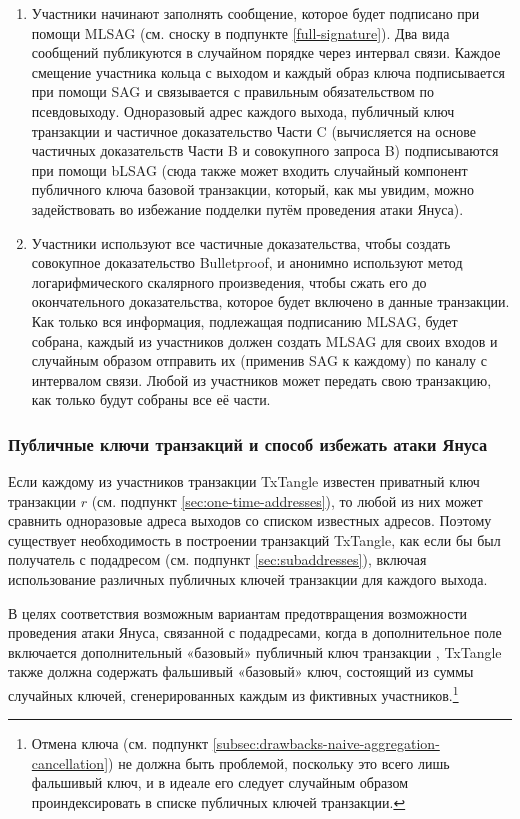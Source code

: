 \begin{enumerate}
    \item Участники начинают заполнять сообщение, которое будет подписано при помощи MLSAG (см. сноску в подпункте \ref{full-signature}). Два вида сообщений публикуются в случайном порядке через интервал связи. Каждое смещение участника кольца с выходом и каждый образ ключа подписывается при помощи SAG и связывается с правильным обязатель\-ством по псевдовыходу. Одноразовый адрес каждого выхода, публичный ключ транзак\-ции и частичное доказательство Части C (вычисляется на основе частичных доказа\-тельств Части B и совокупного запроса B) подписываются при помощи bLSAG (сюда также может входить случайный компонент публичного ключа базовой транзакции, который, как мы увидим, можно задействовать во избежание подделки путём проведе\-ния атаки Януса).
    \item Участники используют все частичные доказательства, чтобы создать совокупное дока\-зательство Bulletproof, и анонимно используют метод логарифмического скалярного произведения, чтобы сжать его до окончательного доказательства, которое будет вклю\-чено в данные транзакции. Как только вся информация, подлежащая подписанию MLSAG, будет собрана, каждый из участников должен создать MLSAG для своих входов и случайным образом отправить их (применив SAG к каждому) по каналу с интервалом связи. Любой из участников может передать свою транзакцию, как только будут собра\-ны все её части.
\end{enumerate}{}

\subsubsection*{Публичные ключи транзакций и способ избежать атаки Януса}

Если каждому из участников транзакции TxTangle известен приватный ключ транзакции $r$ (см. подпункт \ref{sec:one-time-addresses}), то любой из них может сравнить одноразовые адреса выходов со списком известных адресов. Поэтому существует необходимость в построении транзакций TxTangle, как если бы был получатель с подадресом (см. подпункт \ref{sec:subaddresses}), включая использование различных публичных ключей транзакции для каждого выхода.

В целях соответствия возможным вариантам предотвращения возможности проведения атаки Януса, связанной с подадресами, когда в дополнительное поле включается дополнительный «базовый» публичный ключ транзакции \cite{janus-mitigation-issue-62}, TxTangle также должна содержать фальшивый «базовый» ключ, состоящий из суммы случайных ключей, сгенерированных каждым из фик\-тивных участников.\footnote{Отмена ключа (см. подпункт \ref{subsec:drawbacks-naive-aggregation-cancellation}) не должна быть проблемой, поскольку это всего лишь фальшивый ключ, и в идеале его следует случайным образом проиндексировать в списке публичных ключей транзакции.}

